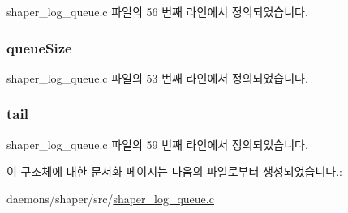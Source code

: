 shaper\+\_\+log\+\_\+queue.\+c 파일의 56 번째 라인에서 정의되었습니다.

\subsubsection[{\texorpdfstring{queue\+Size}{queueSize}}]{ queue\+Size}\hypertarget{structshaper__log__queue_acdc388d91657198c5b07921a3d849f23}{}\label{structshaper__log__queue_acdc388d91657198c5b07921a3d849f23}


shaper\+\_\+log\+\_\+queue.\+c 파일의 53 번째 라인에서 정의되었습니다.

\subsubsection[{\texorpdfstring{tail}{tail}}]{ tail}\hypertarget{structshaper__log__queue_a3da51da0aebd2ac8b1ab802259126311}{}\label{structshaper__log__queue_a3da51da0aebd2ac8b1ab802259126311}


shaper\+\_\+log\+\_\+queue.\+c 파일의 59 번째 라인에서 정의되었습니다.



이 구조체에 대한 문서화 페이지는 다음의 파일로부터 생성되었습니다.\+:\begin{DoxyCompactItemize}
\item 
daemons/shaper/src/\hyperlink{shaper__log__queue_8c}{shaper\+\_\+log\+\_\+queue.\+c}\end{DoxyCompactItemize}

